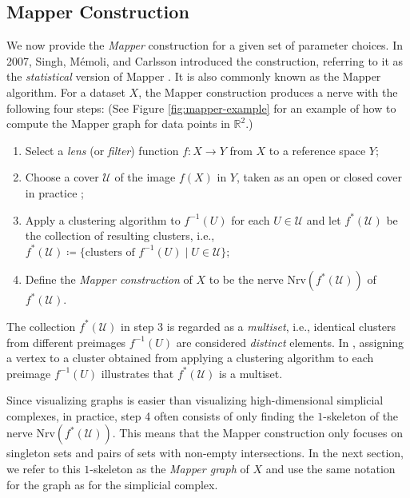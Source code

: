 \documentclass[reqno,oneside,11pt]{amsart}
\theoremstyle{definition}
\theoremstyle{remark}
\def\R{\mathbb{R}}
\begin{document}
%

\subsection{Mapper Construction}
We now provide the \emph{Mapper} construction for a given set of parameter choices. In 2007, Singh, Mémoli, and Carlsson introduced the construction,  referring to it as the {\it statistical} version of Mapper \cite{singh2007topological}. It is also commonly known as the Mapper algorithm. For a dataset $X$, the Mapper construction produces a nerve with the following four steps: (See Figure \ref{fig:mapper-example} for an example of how to compute the Mapper graph for data points in $\R^2$.)
\begin{enumerate}
\item Select a \emph{lens} (or \emph{filter}) function $f\colon X \to Y$ from $X$ to a reference space $Y$;

\item Choose a cover $\mathcal{U}$ of the image $f(X)$ in $Y$, taken as an open or closed cover in practice \cite{carlsson2009topology};

\item Apply a clustering algorithm to $f^{-1}(U)$ for each $U \in \mathcal{U}$ and let $f^\ast(\mathcal{U})$ be the collection of resulting clusters, i.e., $f^\ast(\mathcal{U}) \coloneq \{\text{clusters of } f^{-1}(U) \mid U \in \mathcal{U}\}$;

\item Define the {\it Mapper construction} of $X$ to be the nerve $\mathrm{Nrv}(f^\ast(\mathcal{U}))$ of $f^\ast(\mathcal{U})$.
\end{enumerate}

The collection $f^\ast(\mathcal{U})$ in step 3 is regarded as a \emph{multiset}, i.e., identical clusters from different preimages $f^{-1}(U)$ are considered \emph{distinct} elements. In \cite{singh2007topological},
assigning a vertex to a cluster obtained from applying a clustering algorithm to each preimage $f^{-1}(U)$ illustrates that $f^\ast(\mathcal{U})$ is a multiset.

Since visualizing graphs is easier than visualizing high-dimensional simplicial complexes, in practice, step 4 often consists of only finding the $1$-skeleton of the nerve $\mathrm{Nrv}(f^\ast(\mathcal{U}))$. This means that the Mapper construction only focuses on singleton sets and pairs of sets with non-empty intersections. In the next section, we refer to this $1$-skeleton as the {\it Mapper graph} of $X$ and use the same notation for the graph as for the simplicial complex.
\end{document}

